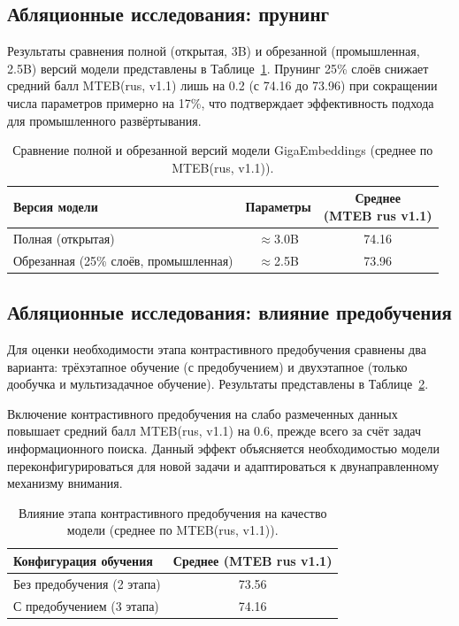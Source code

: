 \subsection{Абляционные исследования: прунинг}\label{subsec:ge_pruning_ablation}

Результаты сравнения полной (открытая, 3B) и обрезанной (промышленная, 2.5B) версий модели представлены в Таблице~\ref{tab:ge_pruning}. Прунинг 25\% слоёв снижает средний балл MTEB(rus, v1.1) лишь на 0.2 (с 74.16 до 73.96) при сокращении числа параметров примерно на 17\%, что подтверждает эффективность подхода для промышленного развёртывания.

\begin{table}[H]
    \centering
    \caption{Сравнение полной и обрезанной версий модели GigaEmbeddings (среднее по MTEB(rus, v1.1)).}
    \label{tab:ge_pruning}
    \begin{tabular}{lcc}
        \toprule
        Версия модели & Параметры & \makecell{Среднее\\(MTEB rus v1.1)} \\
        \midrule
        Полная (открытая)                       & $\approx$3.0B & 74.16 \\
        Обрезанная (25\% слоёв, промышленная)   & $\approx$2.5B & 73.96 \\
        \bottomrule
    \end{tabular}
\end{table}

\subsection{Абляционные исследования: влияние предобучения}\label{subsec:ge_pretrain_ablation}

Для оценки необходимости этапа контрастивного предобучения сравнены два варианта: трёхэтапное обучение (с предобучением) и двухэтапное (только дообучка и мультизадачное обучение). Результаты представлены в Таблице~\ref{tab:ge_pretrain_ablation}.

Включение контрастивного предобучения на слабо размеченных данных повышает средний балл MTEB(rus, v1.1) на 0.6, прежде всего за счёт задач информационного поиска. Данный эффект объясняется необходимостью модели переконфигурироваться для новой задачи и адаптироваться к двунаправленному механизму внимания.

\begin{table}[H]
    \centering
    \caption{Влияние этапа контрастивного предобучения на качество модели (среднее по MTEB(rus, v1.1)).}
    \label{tab:ge_pretrain_ablation}
    \begin{tabular}{lc}
        \toprule
        Конфигурация обучения & Среднее (MTEB rus v1.1) \\
        \midrule
        Без предобучения (2 этапа) & 73.56 \\
        С предобучением (3 этапа)  & 74.16 \\
        \bottomrule
    \end{tabular}
\end{table}

